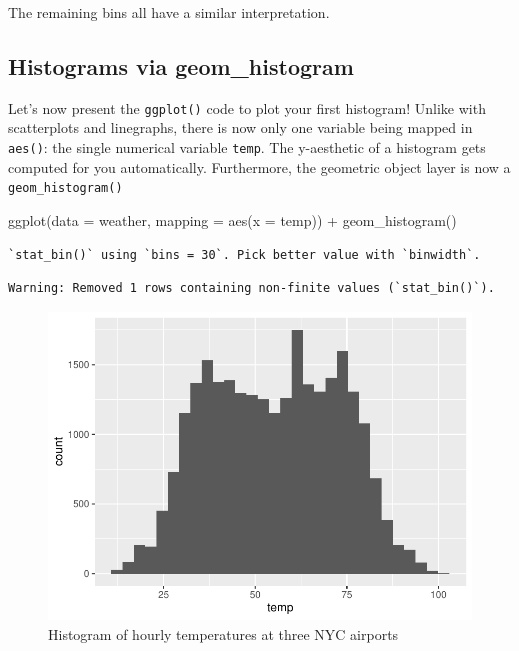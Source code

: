 \documentclass[
  letterpaper,
  DIV=11,
  numbers=noendperiod]{scrreprt}
\newenvironment{Shaded}{\begin{snugshade}}{\end{snugshade}}
\newcommand{\AttributeTok}[1]{\textcolor[rgb]{0.40,0.45,0.13}{#1}}
\newcommand{\FunctionTok}[1]{\textcolor[rgb]{0.28,0.35,0.67}{#1}}
\newcommand{\NormalTok}[1]{\textcolor[rgb]{0.00,0.23,0.31}{#1}}
\newcommand{\SpecialCharTok}[1]{\textcolor[rgb]{0.37,0.37,0.37}{#1}}
\theoremstyle{definition}
\theoremstyle{remark}
\begin{document}
The remaining bins all have a similar interpretation.

\hypertarget{sec-geomhistogram}{%
\subsection{Histograms via geom\_histogram}\label{sec-geomhistogram}}

Let's now present the \texttt{ggplot()} code to plot your first
histogram! Unlike with scatterplots and linegraphs, there is now only
one variable being mapped in \texttt{aes()}: the single numerical
variable \texttt{temp}. The y-aesthetic of a histogram gets computed for
you automatically. Furthermore, the geometric object layer is now a
\texttt{geom\_histogram()}

\begin{Shaded}
\begin{Highlighting}[]
\FunctionTok{ggplot}\NormalTok{(}\AttributeTok{data =}\NormalTok{ weather, }\AttributeTok{mapping =} \FunctionTok{aes}\NormalTok{(}\AttributeTok{x =}\NormalTok{ temp)) }\SpecialCharTok{+}
  \FunctionTok{geom\_histogram}\NormalTok{()}
\end{Highlighting}
\end{Shaded}

\begin{verbatim}
`stat_bin()` using `bins = 30`. Pick better value with `binwidth`.
\end{verbatim}

\begin{verbatim}
Warning: Removed 1 rows containing non-finite values (`stat_bin()`).
\end{verbatim}

\begin{figure}[H]

{\centering \includegraphics{02-visualization_files/figure-pdf/fig-weather-histogram-1.pdf}

}

\caption{\label{fig-weather-histogram}Histogram of hourly temperatures
at three NYC airports}

\end{figure}
\end{document}
